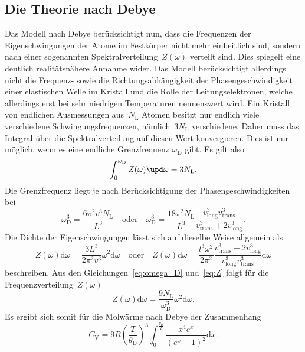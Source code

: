 \subsection{Die Theorie nach Debye}
%
Das Modell nach Debye berücksichtigt nun, dass die Frequenzen der
Eigenschwingungen der Atome im Festkörper nicht mehr einheitlich sind, sondern
nach einer sogenannten Spektralverteilung~$Z(\omega)$ verteilt sind. Dies
spiegelt eine deutlich realitätsnähere Annahme wider. Das Modell berücksichtigt
allerdings nicht die Frequenz- sowie die Richtungsabhängigkeit der
Phasengeschwindigkeit einer elastischen Welle im Kristall und die Rolle der
Leitungselektronen, welche allerdings erst bei sehr niedrigen Temperaturen
nennenswert wird. Ein Kristall von endlichen Ausmessungen aus~$N_{\mathrm{L}}$
Atomen besitzt nur endlich viele verschiedene Schwingungsfrequenzen,
nämlich~$3N_{\mathrm{L}}$ verschiedene. Daher muss das Integral über die
Spektralverteilung auf diesen Wert konvergieren. Dies ist nur möglich, wenn es
eine endliche Grenzfrequenz $\omega_{\mathrm{D}}$ gibt. Es gilt also
%
\begin{equation}
  \int_0^{\omega_{\mathrm{D}}}Z(\omega)\upd\omega=3N_{\mathrm{L}}.
  \label{eq:konv}
\end{equation}
%
Die Grenzfrequenz liegt je nach Berücksichtigung der Phasengeschwindigkeiten bei
%
\begin{equation}
  \omega_{\mathrm{D}}^3=\frac{6\pi^2v^3N_{\mathrm{L}}}{L^3}\quad\text{oder}\quad\omega_{\mathrm{D}}^3=\frac{18\pi^2N_{\mathrm{L}}}{L^3}\frac{v_{\mathrm{long}}^3v_{\mathrm{trans}}^3}{v_{\mathrm{trans}}^3+2v_{\mathrm{long}}^3}.
  \label{eq:omega_D}
\end{equation}
%
Die Dichte der Eigenschwingungen lässt sich auf dieselbe Weise allgemein als
%
\begin{equation}
  Z(\omega)\mathup{d}\omega=\frac{3L^3}{2\pi^2v^3}\omega^2\mathup{d}\omega\quad\text{oder}\quad Z(\omega)\mathup{d}\omega=\frac{l^3\omega^2}{2\pi^2}\frac{v_{\mathrm{trans}}^3+2v_{\mathrm{long}}^3}{v_{\mathrm{long}}^3v_{\mathrm{trans}}^3}\mathup{d}\omega
  \label{eq:Z}
\end{equation}
%
beschreiben. Aus den Gleichungen~\eqref{eq:omega_D} und~\eqref{eq:Z} folgt für
die Frequenzverteilung~$Z(\omega)$
%
\begin{equation}
  Z(\omega)\mathup{d}\omega=\frac{9N_{\mathrm{L}}}{\omega_{\mathrm{D}}^3}\omega^2\mathup{d}\omega.
\end{equation}
%
Es ergibt sich somit für die Molwärme nach Debye der Zusammenhang
%
\begin{equation}
  C_{\mathrm{V}}=9R\left(\frac{T}{\theta_{\mathrm{D}}}\right)^3\int_0^{\frac{\theta_{\mathrm{D}}}{T}}\frac{x^4e^x}{(e^x-1)^2}\mathup{d}x.
  \label{eq:debyetemperatur}
\end{equation}
